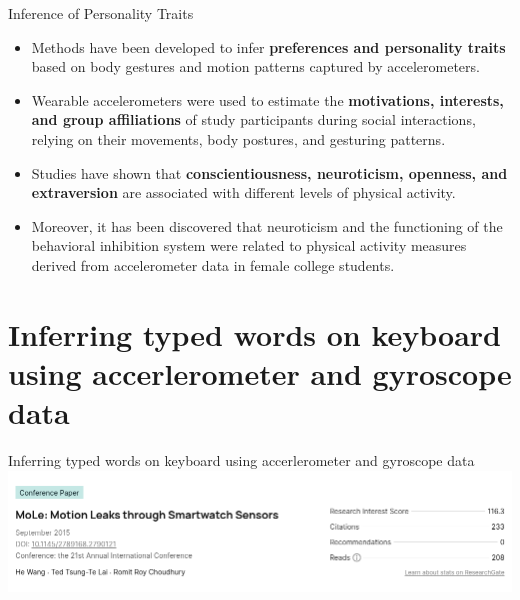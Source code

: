 \documentclass[ucs,9pt,usenames,dvipsnames]{beamer}
\begin{document}
\begin{frame}{Inference of Personality Traits}
	\begin{itemize}
 		\item Methods have been developed to infer \textbf{preferences and
 		personality traits} based on body gestures and motion patterns
 		captured by accelerometers. 
 		\item Wearable accelerometers were
 		used to estimate the \textbf{motivations, interests, and group affiliations} of study participants during social interactions, relying
 		on their movements, body postures, and gesturing patterns.
 		
 		\item %
 		Studies have shown that \textbf{conscientiousness, neuroticism, openness, and
 		extraversion} are associated with different levels of physical
 		activity. %
 		\item Moreover, it has been discovered that neuroticism and the functioning of the
 		behavioral inhibition system were related to physical activity
 		measures derived from accelerometer data in female college
 		students.
	\end{itemize}
\end{frame}


\section{Inferring typed words on keyboard using accerlerometer and gyroscope data}

\begin{frame}{Inferring typed words on keyboard using accerlerometer and gyroscope data}
	\includegraphics[width=1\linewidth]{imgs/MoLePaper}
\end{frame}
\end{document}
